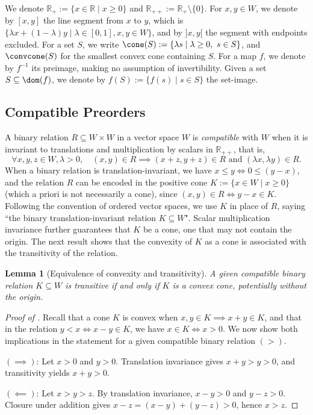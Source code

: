 \documentclass{article}
\theoremstyle{plain}
\newtheorem{lemma}[lemma]{Lemma}
\theoremstyle{definition}
\theoremstyle{remark}
\begin{document}
We denote $\mathbb{R}_{+} := \{x \in \mathbb{R} \mid x \ge 0\}$ and
$\mathbb{R}_{++} := \mathbb{R}_+  \setminus \{0\}$.
For $x, y \in W$, we denote by $[x, y]$ the line segment from $x$ to $y$,
which is $\{\lambda x + (1-\lambda) y \mid \lambda \in [0, 1],  x, y \in W\}$,
and by $]x, y[$ the segment with endpoints excluded.
For a set $S$, we write $\cone(S) := \{\lambda s \mid \lambda \ge 0,\ s \in S\}$, and $\convcone(S)$ for the smallest convex cone containing $S$.
For a map $f$, we denote by $f^{-1}$ its preimage, making no assumption
of invertibility. Given a set $S \subseteq \dom(f)$, we denote by
$f(S) := \{f(s)\mid s \in S\}$ the set-image.
\subsection{Compatible Preorders}
\label{loc:body.notation.compatible_preorders}
A binary relation $R \subseteq W \times W$ in a vector space $W$ is \emph{compatible} with
$W$ when it is invariant to translations and multiplication by scalars in
$\mathbb{R}_{++}$, that is,
\begin{equation*}
\forall x, y, z \in W, \lambda > 0, \quad (x,  y) \in R \implies (x + z, y+z) \in R \text{ and } (\lambda x, \lambda y) \in R.
\end{equation*}
When a binary relation is translation-invariant, we have $x \le y \iff 0 \le (y-x)$,
and the relation $R$ can be encoded in the positive cone $K := \{x \in W \mid x \ge 0\}$ (which a priori is not necessarily a cone),
since $(x, y) \in R \iff y-x \in K$. Following the convention
of ordered vector spaces, we use $K$ in place of $R$, saying 
``the binary translation-invariant relation $K \subseteq W$".
Scalar multiplication invariance further guarantees that $K$ be a cone,
one that may not contain the origin. The next result shows that the
convexity of $K$ as a cone is associated with the transitivity of the relation.
\begin{lemma}[Equivalence of convexity and transitivity]
\label{loc:equivalence_of_convexity_and_transitivity.statement}
A given compatible binary relation $K \subseteq W$ is transitive if and only if
$K$ is a convex cone, potentially without the origin.
\end{lemma}
\begin{proof}[\hypertarget{loc:equivalence_of_convexity_and_transitivity.proof}{}Proof of ]

Recall that a cone $K$ is convex when $x, y \in K \implies x + y \in K$,
and that in the relation $y < x \iff  x-y \in K$, we have $x \in K \iff x > 0$. We now show both implications in the statement for a given compatible binary relation $(>)$.

$(\implies)$:
Let $x > 0$ and $y > 0$. Translation invariance gives $x + y > y > 0$, and transitivity yields $x + y > 0$.

$(\impliedby)$:
Let $x > y > z$. By translation invariance, $x-y > 0$ and $y-z > 0$. 
Closure under addition gives $x-z = (x-y)+(y-z) > 0$, hence $x > z$.
\end{proof}
\end{document}
